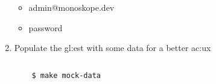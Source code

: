 \begin{enumerate}
  \begin{itemize}
    \item {} admin@monoskope.dev
    \item {} password
  \end{itemize}

  \item Populate the \gls{gl:est} with some data for a better \gls{ac:ux}

  \begin{lstlisting}[language=bash, caption={Populate the \gls{gl:est} with some data}, label={sh:pemd}]
    
    $ make mock-data
  \end{lstlisting}
\end{enumerate}
